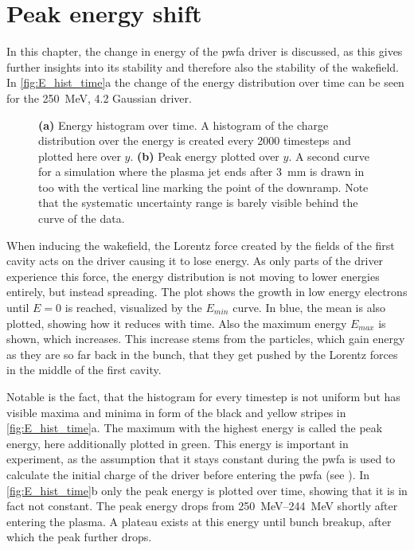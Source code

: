 \documentclass[bachelor_thesis]{subfiles}
\begin{document}
\section{Peak energy shift} \label{chap:E_shift}
In this chapter, the change in energy of the \gls{pwfa} driver is discussed, as this gives further insights into its stability and therefore also the stability of the wakefield.
In \autoref{fig:E_hist_time}a the change of the energy distribution over time can be seen for the \qty{250}{\MeV}, \qty{4.2}{\mrad} Gaussian driver.
\begin{figure}
	\centering
	
	\caption{
	\textbf{(a)} Energy histogram over time. A histogram of the charge distribution over the energy is created every 2000 timesteps and plotted here over $y$.
	\textbf{(b)} Peak energy plotted over $y$. A second curve for a simulation where the plasma jet ends after \qty{3}{\mm} is drawn in too with the vertical line marking the point of the downramp. 
	Note that the systematic uncertainty range is barely visible behind the curve of the data.}
	\label{fig:E_hist_time}
\end{figure}
When inducing the wakefield, the Lorentz force created by the fields of the first cavity acts on the driver causing it to lose energy. As only parts of the driver experience this force, the energy distribution is not moving to lower energies entirely, but instead spreading.
The plot shows the growth in low energy electrons until $E=0$ is reached, visualized by the $E_{min}$ curve. In blue, the mean is also plotted, showing how it reduces with time. Also the maximum energy $E_{max}$ is shown, which increases.
This increase stems from the particles, which gain energy as they are so far back in the bunch, that they get pushed by the Lorentz forces in the middle of the first cavity.

Notable is the fact, that the histogram for every timestep is not uniform but has visible maxima and minima in form of the black and yellow stripes in \autoref{fig:E_hist_time}a. The maximum with the highest energy is called the peak energy, here additionally plotted in green.
This energy is important in experiment, as the assumption that it stays constant during the \gls{pwfa} is used to calculate the initial charge of the driver before entering the \gls{pwfa} (see \cite{Schoebel2022}).
In \autoref{fig:E_hist_time}b only the peak energy is plotted over time, showing that it is in fact not constant. The peak energy drops from \qtyrange{250}{244}{\MeV} shortly after entering the plasma.
A plateau exists at this energy until bunch breakup, after which the peak further drops.
\end{document}
